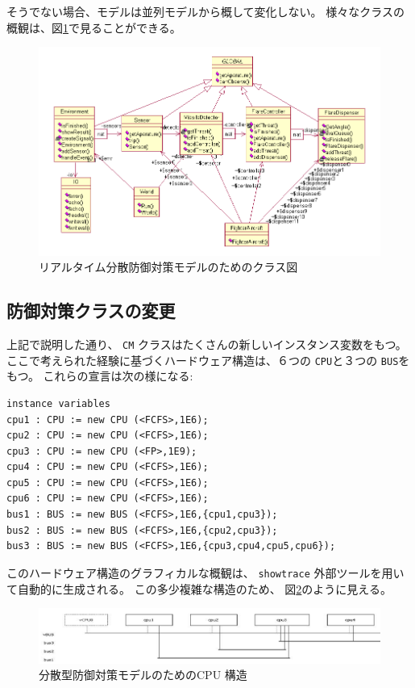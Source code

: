 \documentclass[\pformat,12pt]{jreport}
\begin{document}
そうでない場合、モデルは並列モデルから概して変化しない。
様々なクラスの概観は、図\ref{fig:classdiagvice}で見ることができる。

\begin{figure}
\begin{center}
\includegraphics[width=\textwidth]{viceCMclassdiag}
\end{center}
\caption{リアルタイム分散防御対策モデルのためのクラス図\label{fig:classdiagvice}}
\end{figure}

\subsection{防御対策クラスの変更}

上記で説明した通り、 \texttt{CM} クラスはたくさんの新しいインスタンス変数をもつ。
ここで考えられた経験に基づくハードウェア構造は、６つの \texttt{CPU}と３つの \texttt{BUS}をもつ。
これらの宣言は次の様になる: 

\begin{lstlisting}
instance variables
cpu1 : CPU := new CPU (<FCFS>,1E6);
cpu2 : CPU := new CPU (<FCFS>,1E6);
cpu3 : CPU := new CPU (<FP>,1E9);
cpu4 : CPU := new CPU (<FCFS>,1E6);
cpu5 : CPU := new CPU (<FCFS>,1E6);
cpu6 : CPU := new CPU (<FCFS>,1E6);
bus1 : BUS := new BUS (<FCFS>,1E6,{cpu1,cpu3});
bus2 : BUS := new BUS (<FCFS>,1E6,{cpu2,cpu3});
bus3 : BUS := new BUS (<FCFS>,1E6,{cpu3,cpu4,cpu5,cpu6});
\end{lstlisting}

このハードウェア構造のグラフィカルな概観は、 \texttt{showtrace} 外部ツールを用いて自動的に生成される。
この多少複雑な構造のため、 図\ref{fig:cpuarchitecture}のように見える。

\begin{figure}
\begin{center}
\includegraphics[width=\textwidth]{cpuarchitecture}
\end{center}
\caption{分散型防御対策モデルのためのCPU 構造
\label{fig:cpuarchitecture}}
\end{figure}
\end{document}
